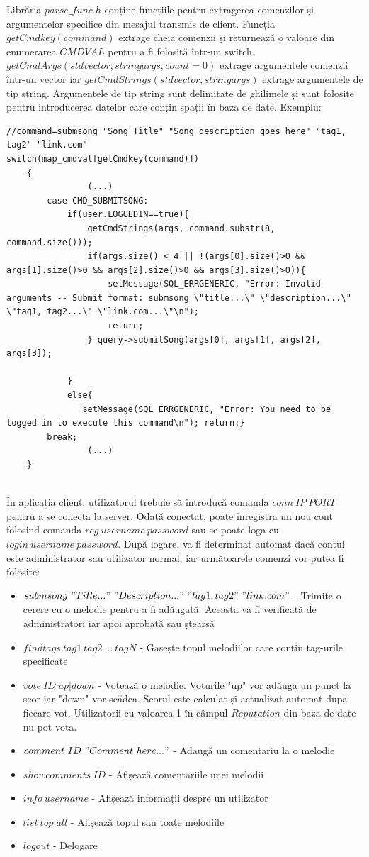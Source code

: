 \documentclass{article}
\begin{document}
Librăria $parse\_func.h$ conține funcțiile pentru extragerea comenzilor și argumentelor specifice din mesajul transmis de client. Funcția $getCmdkey(command)$ extrage cheia comenzii și returnează o valoare din enumerarea $CMDVAL$ pentru a fi folosită într-un switch. $getCmdArgs(std vector, string args, count=0)$ extrage argumentele comenzii într-un vector iar $getCmdStrings(std vector, string args)$ extrage argumentele de tip string. Argumentele de tip string sunt delimitate de ghilimele și sunt folosite pentru introducerea datelor care conțin spații în baza de date. 
Exemplu:
\begin{lstlisting}
//command=submsong "Song Title" "Song description goes here" "tag1, tag2" "link.com"
switch(map_cmdval[getCmdkey(command)])
    {
				(...)
        case CMD_SUBMITSONG:
            if(user.LOGGEDIN==true){
                getCmdStrings(args, command.substr(8, command.size()));
                if(args.size() < 4 || !(args[0].size()>0 && args[1].size()>0 && args[2].size()>0 && args[3].size()>0)){
                    setMessage(SQL_ERRGENERIC, "Error: Invalid arguments -- Submit format: submsong \"title...\" \"description...\" 	\"tag1, tag2...\" \"link.com...\"\n");
                    return;
                } query->submitSong(args[0], args[1], args[2], args[3]);
               
            }
            else{
               setMessage(SQL_ERRGENERIC, "Error: You need to be logged in to execute this command\n"); return;}
		break;
				(...)
	}
 
\end{lstlisting}

În aplicația client, utilizatorul trebuie să introducă comanda $conn\ IP\ PORT$ pentru a se conecta la server. Odată conectat, poate înregistra un nou cont folosind comanda $reg\ username\ password$ sau se poate loga cu $login\ username\ password$. După logare, va fi determinat automat dacă contul este administrator sau utilizator normal, iar următoarele comenzi vor putea fi folosite: 
\begin{itemize}
\item $submsong\ "Title..."\ "Description..."\  "tag1, tag2"\  "link.com"$ - Trimite o cerere cu o melodie pentru a fi adăugată. Aceasta va fi verificată de administratori iar apoi aprobată sau ștearsă
\item $findtags\ tag1\ tag2\ ...\ tagN$ - Gasește topul melodiilor care conțin tag-urile specificate
\item $vote\ ID\ up|down$ - Votează o melodie. Voturile "up" vor adăuga un punct la scor iar "down" vor scădea. Scorul este calculat și actualizat automat după fiecare vot. Utilizatorii cu valoarea 1 în câmpul $Reputation$ din baza de date nu pot vota.
\item $comment\ ID\ "Comment\ here..."$ - Adaugă un comentariu la o melodie
\item $showcomments\ ID$ - Afișează comentariile unei melodii
\item $info\ username$ - Afișează informații despre un utilizator
\item $list\ top|all$ - Afișează topul sau toate melodiile
\item $logout$ - Delogare
\end{itemize}
\end{document}
